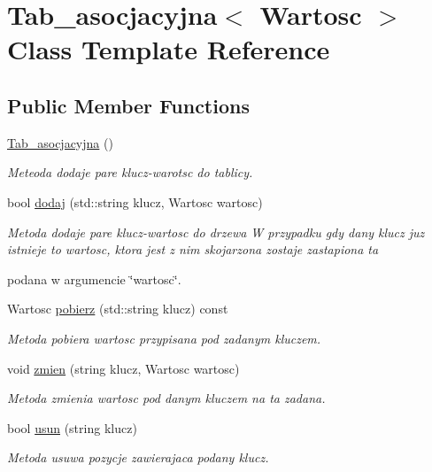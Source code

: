 \hypertarget{class_tab__asocjacyjna}{\section{Tab\-\_\-asocjacyjna$<$ Wartosc $>$ Class Template Reference}
\label{class_tab__asocjacyjna}
}
\subsection*{Public Member Functions}
\begin{DoxyCompactItemize}
\item 
\hyperlink{class_tab__asocjacyjna_a465457801b64312222d3fb84e619c36d}{Tab\-\_\-asocjacyjna} ()
\begin{DoxyCompactList}\small\item\em Meteoda dodaje pare klucz-\/warotsc do tablicy. \end{DoxyCompactList}\item 
bool \hyperlink{class_tab__asocjacyjna_aa7c10f41430741e807cefe28eaf4eefd}{dodaj} (std\-::string klucz, Wartosc wartosc)
\begin{DoxyCompactList}\small\item\em Metoda dodaje pare klucz-\/wartosc do drzewa W przypadku gdy dany klucz juz istnieje to wartosc, ktora jest z nim skojarzona zostaje zastapiona ta\par
 podana w argumencie \char`\"{}wartosc\char`\"{}. \end{DoxyCompactList}\item 
Wartosc \hyperlink{class_tab__asocjacyjna_a476dbee271544484ee672bbddbd64aaf}{pobierz} (std\-::string klucz) const 
\begin{DoxyCompactList}\small\item\em Metoda pobiera wartosc przypisana pod zadanym kluczem. \end{DoxyCompactList}\item 
void \hyperlink{class_tab__asocjacyjna_ab83db4aa7d437e5d494bb9afc1f7100c}{zmien} (string klucz, Wartosc wartosc)
\begin{DoxyCompactList}\small\item\em Metoda zmienia wartosc pod danym kluczem na ta zadana. \end{DoxyCompactList}\item 
bool \hyperlink{class_tab__asocjacyjna_ab631e0224755e0b2399afe8bd00cf4a6}{usun} (string klucz)
\begin{DoxyCompactList}\small\item\em Metoda usuwa pozycje zawierajaca podany klucz. \end{DoxyCompactList}\item 

\end{DoxyCompactItemize}
